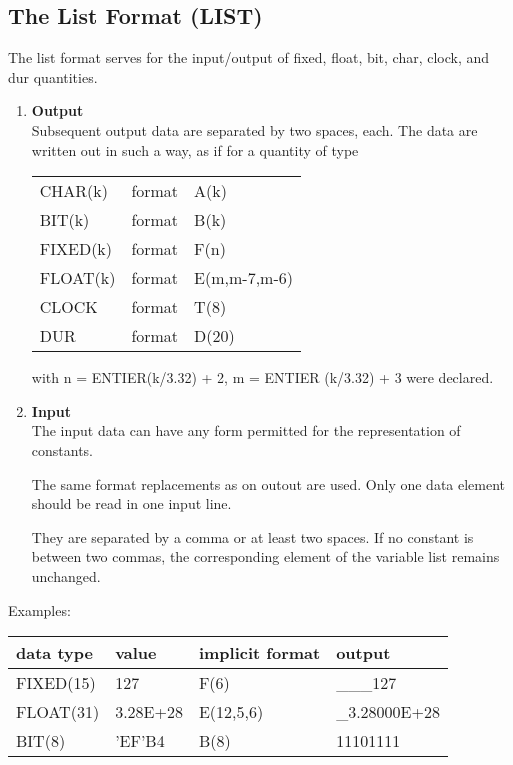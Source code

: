 \subsection{The List Format (LIST)}    %
\label{sec_dation_list_format}



The list format serves for the input/output of fixed, float, bit, char,
clock, and dur quantities.
\begin{enumerate}
\item {\bf Output}\\
Subsequent output data are separated by two spaces, each. The data are
written out in such a way, as if for a quantity of type

\begin{tabular}{lll}
CHAR(k)  & format & A(k)\\
BIT(k)   & format & B(k)\\
FIXED(k) & format & F(n)\\
FLOAT(k) & format & E(m,m-7,m-6)\\
CLOCK    & format & T(8)\\
DUR      & format & D(20)
\end{tabular}

with n = ENTIER(k/3.32) + 2, m = ENTIER (k/3.32) + 3 were
declared.
\item {\bf Input}\\
The input data can have any form permitted for the representation of
constants. 
\begin{added}
The same format replacements as on outout are used.
Only one data element should be read in one input line.
\end{added} 
\begin{removed}
They are separated by a comma or at least two spaces. If no
constant is between two commas, the corresponding element of the
variable list remains unchanged.
\end{removed}
\end{enumerate}

Examples:

\begin{tabular}{llll}
data type & value    & implicit format & output \\ \hline
FIXED(15) & 127      & F(6)            & \_\_\_127 \\
FLOAT(31) & 3.28E+28 & E(12,5,6)       & \_3.28000E+28\\
BIT(8)    & 'EF'B4   & B(8)            & 11101111
\end{tabular}

